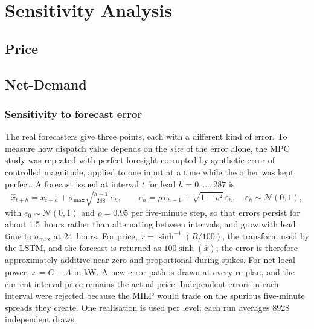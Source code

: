 \section{Sensitivity Analysis}
\subsection{Price}

\subsection{Net-Demand}
\subsubsection{Sensitivity to forecast error}
\label{sec:results:mpc:noise}

The real forecasters give three points, each with a different kind of error. To measure
how dispatch value depends on the \emph{size} of the error alone, the MPC study was
repeated with perfect foresight corrupted by synthetic error of controlled magnitude,
applied to one input at a time while the other was kept perfect. A forecast issued at
interval $t$ for lead $h = 0, \dots, 287$ is
\begin{equation}
    \hat{x}_{t+h} = x_{t+h} + \sigma_{\max} \sqrt{\tfrac{h+1}{288}}\, e_h,
    \qquad e_h = \rho\, e_{h-1} + \sqrt{1-\rho^2}\, \varepsilon_h, \quad \varepsilon_h \sim \mathcal{N}(0,1),
    \label{eq:noise}
\end{equation}
with $e_0 \sim \mathcal{N}(0,1)$ and $\rho = 0.95$ per five-minute step, so that errors
persist for about 1.5~hours rather than alternating between intervals, and grow with lead
time to $\sigma_{\max}$ at 24~hours. For price, $x = \sinh^{-1}(R/100)$, the transform
used by the LSTM, and the forecast is returned as $100 \sinh(\hat{x})$; the error is
therefore approximately additive near zero and proportional during spikes. For net
local power, $x = G - A$ in kW. A new error path is drawn at every re-plan, and the
current-interval price remains the actual price. Independent errors in each interval
were rejected because the MILP would trade on the spurious five-minute spreads they
create. One realisation is used per level; each run averages 8928 independent draws.

